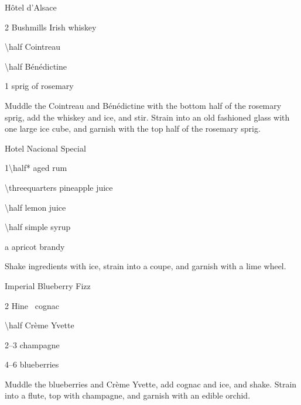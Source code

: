 \begin{PDTCocktail}{H\^otel d'Alsace}
	\begin{Ingredients}
	\item \SI{2}{\oz} Bushmills Irish whiskey
	\item \SI{\half}{\oz} Cointreau
	\item \SI{\half}{\oz} B\'en\'edictine
	\item 1 sprig of rosemary
	\end{Ingredients}
	
	\begin{Instructions}
	Muddle the Cointreau and B\'en\'edictine with the bottom half of the rosemary sprig, add the whiskey and ice, and stir.  Strain into an old fashioned glass with one large ice cube, and garnish with the top half of the rosemary sprig.
	\end{Instructions}
\end{PDTCocktail}

\begin{PDTCocktail*}{Hotel Nacional Special}
	\begin{Ingredients}
	\item \SI{1\half*}{\oz} aged rum
	\item \SI{\threequarters}{\oz} pineapple juice
	\item \SI{\half}{\oz} lemon juice
	\item \SI{\half}{\oz} simple syrup
	\item a \si{\dash} apricot brandy
	\end{Ingredients}
	
	\begin{Instructions}
	Shake ingredients with ice, strain into a coupe, and garnish with a lime wheel.
	\end{Instructions}
\end{PDTCocktail*}

\begin{PDTCocktail}{Imperial Blueberry Fizz}
	\begin{Ingredients}
	\item \SI{2}{\oz} Hine \vsop\ cognac
	\item \SI{\half}{\oz} Cr\`eme Yvette
	\item \SIrange{2}{3}{\oz} champagne
	\item \numrange{4}{6} blueberries
	\end{Ingredients}
	
	\begin{Instructions}
	Muddle the blueberries and Cr\`eme Yvette, add cognac and ice, and shake.  Strain into a flute, top with champagne, and garnish with an edible orchid.
	\end{Instructions}
\end{PDTCocktail}


